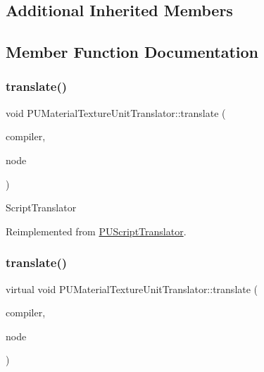 \subsection*{Additional Inherited Members}


\subsection{Member Function Documentation}
\mbox{\label{classPUMaterialTextureUnitTranslator_aa5dc7549395c449c2c920f69eb35db3f}} 
\subsubsection{\texorpdfstring{translate()}{translate()}\hspace{0.1cm}{\footnotesize\ttfamily [1/2]}}
{\footnotesize\ttfamily void P\+U\+Material\+Texture\+Unit\+Translator\+::translate (\begin{DoxyParamCaption}\item[{\hyperlink{classPUScriptCompiler}{P\+U\+Script\+Compiler} $\ast$}]{compiler,  }\item[{\hyperlink{classPUAbstractNode}{P\+U\+Abstract\+Node} $\ast$}]{node }\end{DoxyParamCaption})\hspace{0.3cm}{\ttfamily [virtual]}}

Script\+Translator 

Reimplemented from \hyperlink{classPUScriptTranslator_a9ff2cdfda9ea8db6fd716e7b69dbe79b}{P\+U\+Script\+Translator}.

\mbox{\label{classPUMaterialTextureUnitTranslator_a38d90b793859446a52a7eb866af8b465}} 
\subsubsection{\texorpdfstring{translate()}{translate()}\hspace{0.1cm}{\footnotesize\ttfamily [2/2]}}
{\footnotesize\ttfamily virtual void P\+U\+Material\+Texture\+Unit\+Translator\+::translate (\begin{DoxyParamCaption}\item[{\hyperlink{classPUScriptCompiler}{P\+U\+Script\+Compiler} $\ast$}]{compiler,  }\item[{\hyperlink{classPUAbstractNode}{P\+U\+Abstract\+Node} $\ast$}]{node }\end{DoxyParamCaption})\hspace{0.3cm}{\ttfamily [virtual]}}

